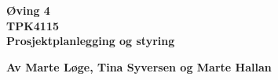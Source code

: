 \begin{titlepage}
\begin{center}

{\Huge \bf Øving 4} \\[1.0cm]
{\Huge \bf TPK4115} \\[1.0cm]
{\Large \bf Prosjektplanlegging og styring} \\[1.0cm]
\vspace{1cm}

{\bf Av Marte Løge, Tina Syversen og Marte Hallan}


\end{center}
\end{titlepage}